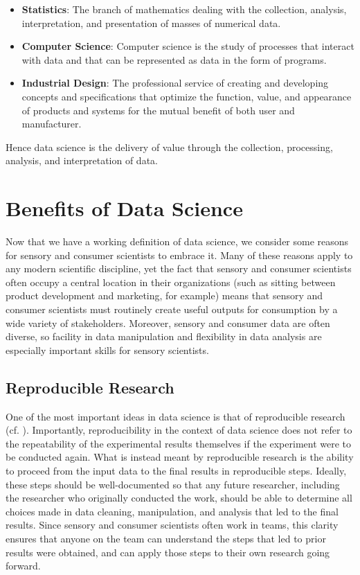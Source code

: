 \documentclass[
]{book}
\providecommand{\tightlist}{%
  \setlength{\itemsep}{0pt}\setlength{\parskip}{0pt}}
\begin{document}
\begin{itemize}
\tightlist
\item
  \textbf{Statistics}: The branch of mathematics dealing with the collection, analysis, interpretation, and presentation of masses of numerical data.
\item
  \textbf{Computer Science}: Computer science is the study of processes that interact with data and that can be represented as data in the form of programs.
\item
  \textbf{Industrial Design}: The professional service of creating and developing concepts and specifications that optimize the function, value, and appearance of products and systems for the mutual benefit of both user and manufacturer.
\end{itemize}

Hence data science is the delivery of value through the collection, processing, analysis, and interpretation of data.

\hypertarget{benefits-of-data-science}{%
\section{Benefits of Data Science}\label{benefits-of-data-science}}

Now that we have a working definition of data science, we consider some reasons for sensory and consumer scientists to embrace it. Many of these reasons apply to any modern scientific discipline, yet the fact that sensory and consumer scientists often occupy a central location in their organizations (such as sitting between product development and marketing, for example) means that sensory and consumer scientists must routinely create useful outputs for consumption by a wide variety of stakeholders. Moreover, sensory and consumer data are often diverse, so facility in data manipulation and flexibility in data analysis are especially important skills for sensory scientists.

\hypertarget{reproducible-research}{%
\subsection{Reproducible Research}\label{reproducible-research}}

One of the most important ideas in data science is that of reproducible research (cf. \citet{Peng2011}). Importantly, reproducibility in the context of data science does not refer to the repeatability of the experimental results themselves if the experiment were to be conducted again. What is instead meant by reproducible research is the ability to proceed from the input data to the final results in reproducible steps. Ideally, these steps should be well-documented so that any future researcher, including the researcher who originally conducted the work, should be able to determine all choices made in data cleaning, manipulation, and analysis that led to the final results. Since sensory and consumer scientists often work in teams, this clarity ensures that anyone on the team can understand the steps that led to prior results were obtained, and can apply those steps to their own research going forward.
\end{document}
